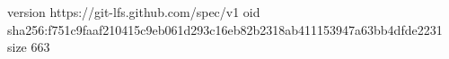 version https://git-lfs.github.com/spec/v1
oid sha256:f751c9faaf210415c9eb061d293c16eb82b2318ab411153947a63bb4dfde2231
size 663
